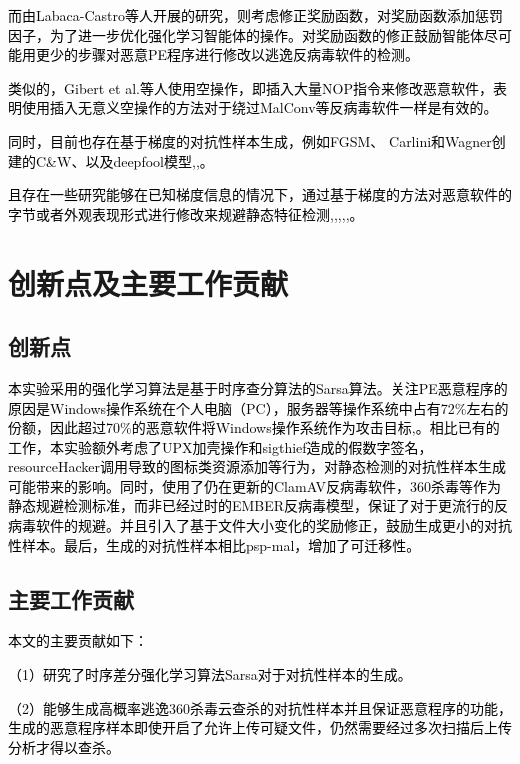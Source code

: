 \textcolor{black}{而由Labaca-Castro等人开展的研究\parencite{ref16}，则考虑修正奖励函数，对奖励函数添加惩罚因子，为了进一步优化强化学习智能体的操作。对奖励函数的修正鼓励智能体尽可能用更少的步骤对恶意PE程序进行修改以逃逸反病毒软件的检测。}

\textcolor{black}{类似的，Gibert et al.等人使用空操作\parencite{ref17}，即插入大量NOP指令来修改恶意软件，表明使用插入无意义空操作的方法对于绕过MalConv等反病毒软件一样是有效的。}

\textcolor{black}{同时，目前也存在基于梯度的对抗性样本生成，例如FGSM、 Carlini和Wagner创建的C\&W、以及deepfool模型\parencite{ref18},\parencite{ref19},\parencite{ref20}。}

\textcolor{black}{且存在一些研究能够在已知梯度信息的情况下，通过基于梯度的方法对恶意软件的字节或者外观表现形式进行修改来规避静态特征检测\parencite{ref21},\parencite{ref22},\parencite{ref23},\parencite{ref24},\parencite{ref25},\parencite{ref26}。}

\section{创新点及主要工作贡献}
\subsection{创新点}

\textcolor{black}{本实验采用的强化学习算法是基于时序查分算法的Sarsa算法。关注PE恶意程序的原因是Windows操作系统在个人电脑（PC），服务器等操作系统中占有72\%左右的份额，因此超过70\%的恶意软件将Windows操作系统作为攻击目标\parencite{ref27},\parencite{ref28}。相比已有的工作，本实验额外考虑了UPX加壳操作和sigthief造成的假数字签名，resourceHacker调用导致的图标类资源添加等行为，对静态检测的对抗性样本生成可能带来的影响。同时，使用了仍在更新的ClamAV反病毒软件，360杀毒等作为静态规避检测标准，而非已经过时的EMBER反病毒模型，保证了对于更流行的反病毒软件的规避。并且引入了基于文件大小变化的奖励修正，鼓励生成更小的对抗性样本。最后，生成的对抗性样本相比psp-mal，增加了可迁移性。}

\subsection{主要工作贡献}

\textcolor{black}{本文的主要贡献如下：}

\textcolor{black}{（1）研究了时序差分强化学习算法Sarsa对于对抗性样本的生成。}

\textcolor{black}{（2）能够生成高概率逃逸360杀毒云查杀的对抗性样本并且保证恶意程序的功能，生成的恶意程序样本即使开启了允许上传可疑文件，仍然需要经过多次扫描后上传分析才得以查杀。}

